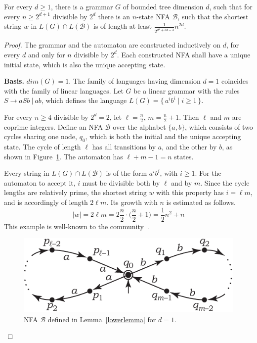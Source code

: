 \documentclass[runningheads]{llncs}
\newcommand{\set}[2]{\{ \, #1 \mid #2 \, \}}
\begin{document}
\begin{lemma}\label{lowerlemma}
For every $d \geqslant 1$,
there is a grammar $G$ of bounded tree dimension $d$,
such that for every $n \geqslant 2^{d+1}$ divisible by $2^d$
there is an $n$-state NFA $\mathcal{B}$,
such that the shortest string $w$ in $L(G) \cap L(\mathcal{B})$
is of length at least $\frac{1}{2^{d^2 + 3d - 3}} n^{2d}$.
\end{lemma}
\begin{proof}
The grammar and the automaton are constructed inductively on $d$,
for every $d$ and only for $n$ divisible by $2^d$.
Each constructed NFA shall have a unique initial state,
which is also the unique accepting state.

\textbf{Basis.} $dim(G) = 1$.
The family of languages having dimension $d = 1$
coincides with the family of linear languages.
Let $G$ be a linear grammar with the rules $S \to aSb \ | \ ab$,
which defines the language $L(G) = \set{a^i b^i}{i \geqslant 1}$. 

For every $n \geqslant 4$ divisible by $2^d=2$,
let $\ell = \frac{n}{2}$, $m=\frac{n}{2} + 1$.
Then $\ell$ and $m$ are coprime integers.
Define an NFA $\mathcal{B}$ over the alphabet $\{a, b\}$,
which consists of two cycles
sharing one node, $q_0$,
which is both the initial and the unique accepting state.
The cycle of length $\ell$ has all transitions by $a$, and the other by $b$,
as shown in Figure~\ref{worstd_1}.
The automaton has $\ell+m-1=n$ states.

Every string in $L(G) \cap L(\mathcal{B})$
is of the form $a^i b^i$, with $i \geqslant 1$.
For the automaton to accept it,
$i$ must be divisible both by $\ell$ and by $m$.
Since the cycle lengths are relatively prime,
the shortest string $w$ with this property has $i=\ell m$,
and is accordingly of length $2\ell m$.
Its growth with $n$ is estimated as follows.
\begin{equation*}
	|w|
		=
	2\ell m
		=
	2 \frac{n}{2} \cdot \Big(\frac{n}{2} + 1\Big)
		=
	\frac{1}{2} n^2 + n
\end{equation*}
This example is well-known to the community~\cite{HellingsCFPQ,Yannakakis}. 

\begin{figure}[t]
\centering
\includegraphics[scale=0.9]{rational_index_A1.pdf}
\caption{NFA $\mathcal{B}$ defined in Lemma~\ref{lowerlemma} for $d=1$.}
\label{worstd_1}
\end{figure}


\end{proof}
\end{document}
